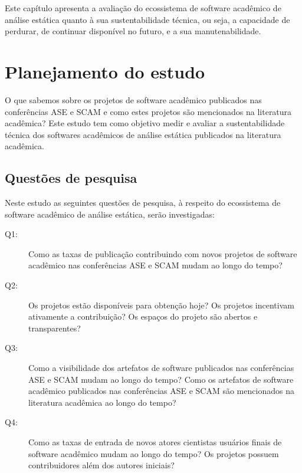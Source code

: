 {Este capítulo apresenta a avaliação do ecossistema de software acadêmico de
análise estática quanto à sua sustentabilidade técnica, ou seja, a capacidade
de perdurar, de continuar disponível no futuro, e a sua manutenabilidade.}


\section{Planejamento do estudo}

O que sabemos sobre os projetos de software acadêmico publicados nas
conferências ASE e SCAM e como estes projetos são mencionados na literatura
acadêmica? Este estudo tem como objetivo medir e avaliar a sustentabilidade
técnica dos softwares acadêmicos de análise estática publicados na literatura
acadêmica.

\subsection{Questões de pesquisa}

Neste estudo as seguintes questões de pesquisa, à respeito do ecossistema de
software acadêmico de análise estática, serão investigadas:

\newcommand{\QuestaoUm}{Como as taxas de publicação contribuindo com novos projetos de software acadêmico nas conferências ASE e SCAM mudam ao longo do tempo?}
\newcommand{\QuestaoDois}{Os projetos estão disponíveis para obtenção hoje? Os projetos incentivam ativamente a contribuição? Os espaços do projeto são abertos e transparentes?}
\newcommand{\QuestaoTres}{Como a visibilidade dos artefatos de software publicados nas conferências ASE e SCAM mudam ao longo do tempo? Como os artefatos de software acadêmico publicados nas conferências ASE e SCAM são mencionados na literatura acadêmica ao longo do tempo?}
\newcommand{\QuestaoQuatro}{Como as taxas de entrada de novos atores cientistas usuários finais de software acadêmico mudam ao longo do tempo? Os projetos possuem contribuidores além dos autores iniciais?}

\begin{description}
  \item [Q1:] \QuestaoUm
  \item [Q2:] \QuestaoDois
  \item [Q3:] \QuestaoTres
  \item [Q4:] \QuestaoQuatro
\end{description}

